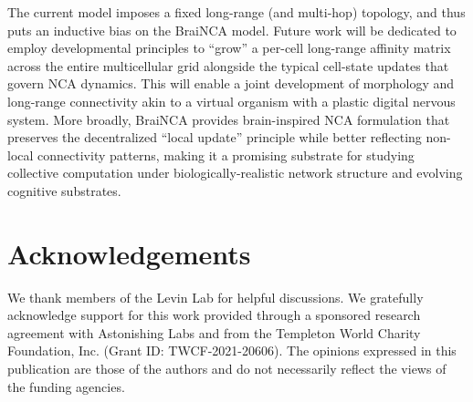 \documentclass[letterpaper]{article}
\begin{document}

The current model imposes a fixed long-range (and multi-hop) topology, and thus puts an inductive bias on the BraiNCA model. Future work will be dedicated to employ developmental principles to ``grow'' a per-cell long-range affinity matrix across the entire multicellular grid alongside the typical cell-state updates that govern NCA dynamics. This will enable a joint development of morphology and long-range connectivity akin to a virtual organism with a plastic digital nervous system. More broadly, BraiNCA provides brain-inspired NCA formulation that preserves the decentralized “local update” principle while better reflecting non-local connectivity patterns, making it a promising substrate for studying collective computation under biologically-realistic network structure and evolving cognitive substrates.


\newpage
\section*{Acknowledgements}

We thank members of the Levin Lab for helpful discussions. 
We gratefully acknowledge support for this work provided through a sponsored research agreement with Astonishing Labs and from the Templeton World Charity Foundation, Inc. (Grant ID: TWCF-2021-20606). The opinions expressed in this publication are those of the authors and do not necessarily reflect the views of the funding agencies.




\end{document}
